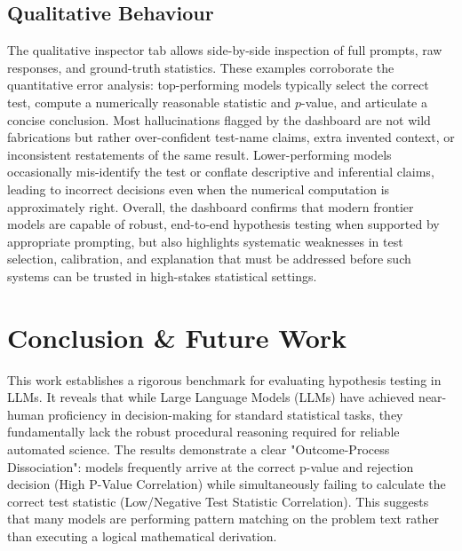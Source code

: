 \documentclass{article}
\begin{document}
\subsection{Qualitative Behaviour}

The qualitative inspector tab allows side-by-side inspection of full prompts, raw responses, and ground-truth statistics. These examples corroborate the quantitative error analysis: top-performing models typically select the correct test, compute a numerically reasonable statistic and $p$-value, and articulate a concise conclusion. Most hallucinations flagged by the dashboard are not wild fabrications but rather over-confident test-name claims, extra invented context, or inconsistent restatements of the same result. Lower-performing models occasionally mis-identify the test or conflate descriptive and inferential claims, leading to incorrect decisions even when the numerical computation is approximately right. Overall, the dashboard confirms that modern frontier models are capable of robust, end-to-end hypothesis testing when supported by appropriate prompting, but also highlights systematic weaknesses in test selection, calibration, and explanation that must be addressed before such systems can be trusted in high-stakes statistical settings.

\section{Conclusion \& Future Work}
This work establishes a rigorous benchmark for evaluating hypothesis testing in LLMs. It reveals that while Large Language Models (LLMs) have achieved near-human proficiency in decision-making for standard statistical tasks, they fundamentally lack the robust procedural reasoning required for reliable automated science. The results demonstrate a clear "Outcome-Process Dissociation": models frequently arrive at the correct p-value and rejection decision (High P-Value Correlation) while simultaneously failing to calculate the correct test statistic (Low/Negative Test Statistic Correlation). This suggests that many models are performing pattern matching on the problem text rather than executing a logical mathematical derivation.
\end{document}
